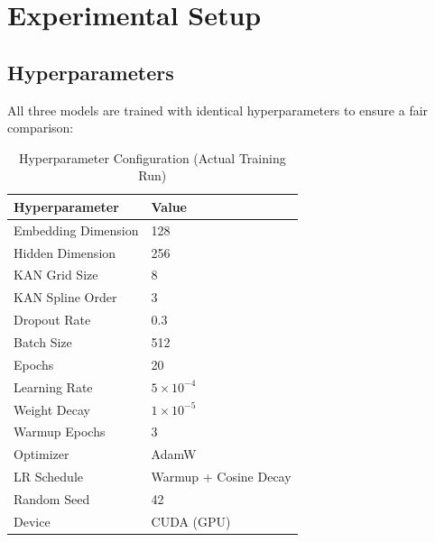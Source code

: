 \documentclass[12pt,a4paper]{report}
\begin{document}
\chapter{Experimental Setup}

\section{Hyperparameters}

All three models are trained with identical hyperparameters to ensure a fair
comparison:

\begin{table}[H]
\centering
\caption{Hyperparameter Configuration (Actual Training Run)}
\begin{tabular}{ll}
\toprule
\textbf{Hyperparameter}          & \textbf{Value}        \\
\midrule
Embedding Dimension              & 128                   \\
Hidden Dimension                 & 256                   \\
KAN Grid Size                    & 8                     \\
KAN Spline Order                 & 3                     \\
Dropout Rate                     & 0.3                   \\
Batch Size                       & 512                   \\
Epochs                           & 20                    \\
Learning Rate                    & $5 \times 10^{-4}$    \\
Weight Decay                     & $1 \times 10^{-5}$    \\
Warmup Epochs                    & 3                     \\
Optimizer                        & AdamW                 \\
LR Schedule                      & Warmup + Cosine Decay \\
Random Seed                      & 42                    \\
Device                           & CUDA (GPU)            \\
\bottomrule
\end{tabular}
\label{tab:hyperparams}
\end{table}
\end{document}
